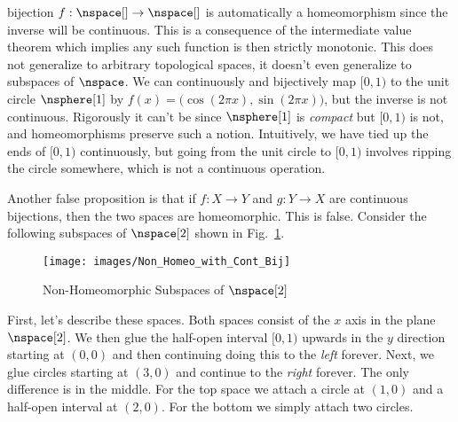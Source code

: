 \documentclass{book}                                                           %
\begin{document}
                bijection $f:\nspace[]\rightarrow\nspace[]$ is automatically a
                homeomorphism since the inverse will be continuous. This is a
                consequence of the intermediate value theorem which implies any
                such function is then strictly monotonic. This does not
                generalize to arbitrary topological spaces, it doesn't even
                generalize to subspaces of $\nspace$. We can continuously and
                bijectively map $[0,1)$ to the unit circle $\nsphere[1]$ by
                $f(x)=\big(\cos(2\pi{x}),\sin(2\pi{x})\big)$, but the inverse is
                not continuous. Rigorously it can't be since $\nsphere[1]$ is
                \textit{compact} but $[0,1)$ is not, and homeomorphisms preserve
                such a notion. Intuitively, we have tied up the ends of $[0,1)$
                continuously, but going from the unit circle to $[0,1)$ involves
                ripping the circle somewhere, which is not a continuous
                operation.
                \par\hfill\par
                Another false proposition is that if $f:X\rightarrow{Y}$ and
                $g:Y\rightarrow{X}$ are continuous bijections, then the two
                spaces are homeomorphic. This is false. Consider the following
                subspaces of $\nspace[2]$ shown in
                Fig.~\ref{fig:Non_Homeomorphic_Subspace}.
                \begin{figure}[H]
                    \centering
                    \captionsetup{type=figure}
                    \texttt{[image: images/Non\_Homeo\_with\_Cont\_Bij]}
                    \caption{Non-Homeomorphic Subspaces of $\nspace[2]$}
                    \label{fig:Non_Homeomorphic_Subspace}
                \end{figure}
                First, let's describe these spaces. Both spaces consist of the
                $x$ axis in the plane $\nspace[2]$. We then glue the half-open
                interval $[0,1)$ upwards in the $y$ direction starting at
                $(0,0)$ and then continuing doing this to the \textit{left}
                forever. Next, we glue circles starting at $(3,0)$ and continue
                to the \textit{right} forever. The only difference is in the
                middle. For the top space we attach a circle at $(1,0)$ and a
                half-open interval at $(2,0)$. For the bottom we simply attach
                two circles.
                \par\hfill\par
\end{document}

